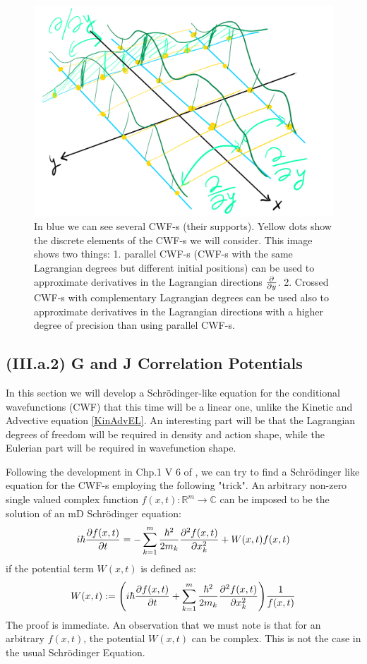 \documentclass[11pt, a4paper]{article} %
\newcommand{\R}{\mathbb{R}} %
\newcommand{\C}{\mathbb{C}}
\begin{document}
\begin{figure}[h!]
  \centering
    \includegraphics[width=0.65\linewidth]{aligned_original.png}
  \caption{In blue we can see several CWF-s (their supports). Yellow dots show the discrete elements of the CWF-s we will consider. This image shows two things: 1. parallel CWF-s (CWF-s with the same Lagrangian degrees but different initial positions) can be used to approximate derivatives in the Lagrangian directions $\pdv{}{y}$. 2. Crossed CWF-s with complementary Lagrangian degrees can be used also to approximate derivatives in the Lagrangian directions with a higher degree of precision than using parallel CWF-s.  }
  \label{fig:aligned2}
\end{figure}


\subsection*{(III.a.2) G and J Correlation Potentials}
In this section we will develop a Schrödinger-like equation for the conditional wavefunctions (CWF) that this time will be a linear one, unlike the Kinetic and Advective equation \eqref{KinAdvEL}. An interesting part will be that the Lagrangian degrees of freedom will be required in density and action shape, while the Eulerian part will be required in wavefunction shape. 

Following the development in Chp.1 V 6 of \cite{JordiXO}, we can try to find a Schrödinger like equation for the CWF-s employing the following "trick". An arbitrary non-zero single valued complex function $f(x, t):\R^m \rightarrow \C$ can be imposed to be the solution of an mD Schrödinger equation:\vspace{-0.3cm}
$$
i \hbar \pdv{f(x,t)}{t} = -\sum_{k=1}^m\frac{\hbar^2}{2 m_k}\pdv[2]{f(x,t)}{x_k} + W(x,t) f(x,t)
$$
if the potential term $W(x, t)$ is defined as:\vspace{-0.3cm}
$$
W(x, t) := \qty(i \hbar \pdv{f(x,t)}{t} +\sum_{k=1}^m\frac{\hbar^2}{2 m_k}\pdv[2]{f(x,t)}{x_k} ) \frac{1}{f(x,t)}\vspace{-0.3cm}
$$
The proof is immediate. An observation that we must note is that for an arbitrary $f(x,t)$, the potential $W(x,t)$ can be complex. This is not the case in the usual Schrödinger Equation.
\end{document}
